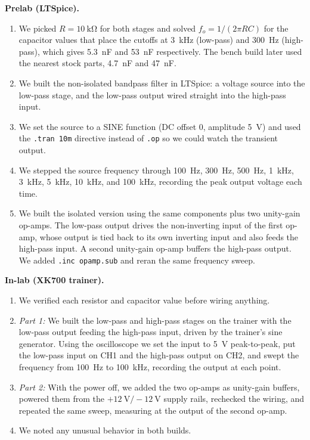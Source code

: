 \documentclass[11pt]{article}
\begin{document}
\textbf{Prelab (LTSpice).}
\begin{enumerate}
    \item We picked \(R = \SI{10}{\kilo\ohm}\) for both stages and solved
          \(f_o = 1/(2\pi R C)\) for the capacitor values that place the cutoffs at
          \SI{3}{\kilo\hertz} (low-pass) and \SI{300}{\hertz} (high-pass), which gives
          \SI{5.3}{\nano\farad} and \SI{53}{\nano\farad} respectively. The bench build
          later used the nearest stock parts, \SI{4.7}{\nano\farad} and
          \SI{47}{\nano\farad}.
    \item We built the non-isolated bandpass filter in LTSpice: a voltage source
          into the low-pass stage, and the low-pass output wired straight into the
          high-pass input.
    \item We set the source to a SINE function (DC offset \(0\), amplitude
          \SI{5}{\volt}) and used the \texttt{.tran 10m} directive instead of
          \texttt{.op} so we could watch the transient output.
    \item We stepped the source frequency through \SI{100}{\hertz},
          \SI{300}{\hertz}, \SI{500}{\hertz}, \SI{1}{\kilo\hertz},
          \SI{3}{\kilo\hertz}, \SI{5}{\kilo\hertz}, \SI{10}{\kilo\hertz}, and
          \SI{100}{\kilo\hertz}, recording the peak output voltage each time.
    \item We built the isolated version using the same components plus two
          unity-gain op-amps. The low-pass output drives the non-inverting input of
          the first op-amp, whose output is tied back to its own inverting input and
          also feeds the high-pass input. A second unity-gain op-amp buffers the
          high-pass output. We added \texttt{.inc opamp.sub} and reran the same
          frequency sweep.
\end{enumerate}

\textbf{In-lab (XK700 trainer).}
\begin{enumerate}
    \item We verified each resistor and capacitor value before wiring anything.
    \item \emph{Part 1:} We built the low-pass and high-pass stages on the trainer
          with the low-pass output feeding the high-pass input, driven by the
          trainer's sine generator. Using the oscilloscope we set the input to
          \SI{5}{\volt} peak-to-peak, put the low-pass input on CH1 and the
          high-pass output on CH2, and swept the frequency from \SI{100}{\hertz}
          to \SI{100}{\kilo\hertz}, recording the output at each point.
    \item \emph{Part 2:} With the power off, we added the two op-amps as unity-gain
          buffers, powered them from the \(+\SI{12}{\volt}/-\SI{12}{\volt}\) supply
          rails, rechecked the wiring, and repeated the same sweep, measuring at the
          output of the second op-amp.
    \item We noted any unusual behavior in both builds.
\end{enumerate}
\end{document}
